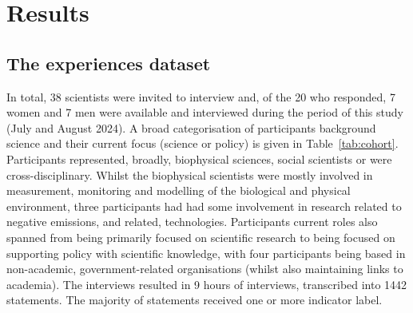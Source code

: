 \chapter{Results}\label{ch:results}

\section{The experiences dataset}\label{sec:resdataset}
In total, 38 scientists were invited to interview and, of the 20 who responded, 7 women and 7 men were available and interviewed during the period of this study (July and August 2024). A broad categorisation of participants background science and their current focus (science or policy) is given in Table~\ref{tab:cohort}. Participants represented, broadly, biophysical sciences, social scientists or were cross-disciplinary. Whilst the biophysical scientists were mostly involved in measurement, monitoring and modelling of the biological and physical environment, three participants had had some involvement in research related to negative emissions, and related, technologies. Participants current roles also spanned from being primarily focused on scientific research to being focused on supporting policy with scientific knowledge, with four participants being based in non-academic, government-related organisations (whilst also maintaining links to academia). The interviews resulted in 9\textonehalf{} hours of interviews, transcribed into 1442 statements. The majority of statements received one or more indicator label.


